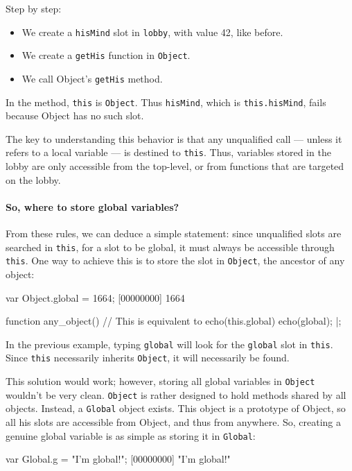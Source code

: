 Step by step:
\begin{itemize}
\item We create a \lstinline|hisMind| slot in \lstinline|lobby|, with
  value 42, like before.
\item We create a \lstinline|getHis| function in \lstinline|Object|.
\item We call Object's \lstinline|getHis| method.
\end{itemize}

In the method, \lstinline|this| is \lstinline|Object|. Thus
\lstinline|hisMind|, which is \lstinline|this.hisMind|, fails because
Object has no such slot.

The key to understanding this behavior is that any unqualified call
--- unless it refers to a local variable --- is destined to
\lstinline|this|. Thus, variables stored in the lobby are only
accessible from the top-level, or from functions that are targeted on
the lobby.

\paragraph{So, where to store global variables?}
From these rules, we can deduce a simple statement: since unqualified
slots are searched in \lstinline|this|, for a slot to be global, it
must always be accessible through \lstinline|this|. One way to achieve
this is to store the slot in \lstinline|Object|, the ancestor of any
object:

\begin{urbiscript}
var Object.global = 1664;
[00000000] 1664

function any_object()
{
  // This is equivalent to echo(this.global)
  echo(global);
}|;
\end{urbiscript}

In the previous example, typing \lstinline|global| will look for the
\lstinline|global| slot in \lstinline|this|. Since \lstinline|this|
necessarily inherits \lstinline|Object|, it will necessarily be found.

This solution would work; however, storing all global variables in
\lstinline|Object| wouldn't be very clean. \lstinline|Object| is
rather designed to hold methods shared by all objects. Instead, a
\lstinline|Global| object exists. This object is a prototype of
Object, so all his slots are accessible from Object, and thus from
anywhere. So, creating a genuine global variable is as simple as
storing it in \lstinline|Global|:

\begin{urbiscript}
var Global.g = "I'm global!";
[00000000] "I'm global!"
\end{urbiscript}

